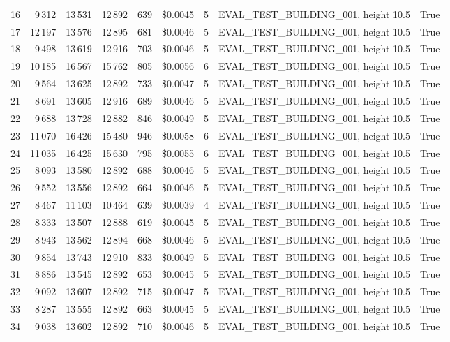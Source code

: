 \documentclass[a4paper,11pt]{article}
\begin{document}
\begin{table}[ht]
\begin{tabular}{r r r r r r r p{3cm} l}
16 & 9\,312 & 13\,531 & 12\,892 & 639 & \$0.0045 & 5 & EVAL\_TEST\_BUILDING\_001, height 10.5 & True \\
17 & 12\,197 & 13\,576 & 12\,895 & 681 & \$0.0046 & 5 & EVAL\_TEST\_BUILDING\_001, height 10.5 & True \\
18 & 9\,498 & 13\,619 & 12\,916 & 703 & \$0.0046 & 5 & EVAL\_TEST\_BUILDING\_001, height 10.5 & True \\
19 & 10\,185 & 16\,567 & 15\,762 & 805 & \$0.0056 & 6 & EVAL\_TEST\_BUILDING\_001, height 10.5 & True \\
20 & 9\,564 & 13\,625 & 12\,892 & 733 & \$0.0047 & 5 & EVAL\_TEST\_BUILDING\_001, height 10.5 & True \\
21 & 8\,691 & 13\,605 & 12\,916 & 689 & \$0.0046 & 5 & EVAL\_TEST\_BUILDING\_001, height 10.5 & True \\
22 & 9\,688 & 13\,728 & 12\,882 & 846 & \$0.0049 & 5 & EVAL\_TEST\_BUILDING\_001, height 10.5 & True \\
23 & 11\,070 & 16\,426 & 15\,480 & 946 & \$0.0058 & 6 & EVAL\_TEST\_BUILDING\_001, height 10.5 & True \\
24 & 11\,035 & 16\,425 & 15\,630 & 795 & \$0.0055 & 6 & EVAL\_TEST\_BUILDING\_001, height 10.5 & True \\
25 & 8\,093 & 13\,580 & 12\,892 & 688 & \$0.0046 & 5 & EVAL\_TEST\_BUILDING\_001, height 10.5 & True \\
26 & 9\,552 & 13\,556 & 12\,892 & 664 & \$0.0046 & 5 & EVAL\_TEST\_BUILDING\_001, height 10.5 & True \\
27 & 8\,467 & 11\,103 & 10\,464 & 639 & \$0.0039 & 4 & EVAL\_TEST\_BUILDING\_001, height 10.5 & True \\
28 & 8\,333 & 13\,507 & 12\,888 & 619 & \$0.0045 & 5 & EVAL\_TEST\_BUILDING\_001, height 10.5 & True \\
29 & 8\,943 & 13\,562 & 12\,894 & 668 & \$0.0046 & 5 & EVAL\_TEST\_BUILDING\_001, height 10.5 & True \\
30 & 9\,854 & 13\,743 & 12\,910 & 833 & \$0.0049 & 5 & EVAL\_TEST\_BUILDING\_001, height 10.5 & True \\
31 & 8\,886 & 13\,545 & 12\,892 & 653 & \$0.0045 & 5 & EVAL\_TEST\_BUILDING\_001, height 10.5 & True \\
32 & 9\,092 & 13\,607 & 12\,892 & 715 & \$0.0047 & 5 & EVAL\_TEST\_BUILDING\_001, height 10.5 & True \\
33 & 8\,287 & 13\,555 & 12\,892 & 663 & \$0.0045 & 5 & EVAL\_TEST\_BUILDING\_001, height 10.5 & True \\
34 & 9\,038 & 13\,602 & 12\,892 & 710 & \$0.0046 & 5 & EVAL\_TEST\_BUILDING\_001, height 10.5 & True \\

\end{tabular}
\end{table}
\end{document}
